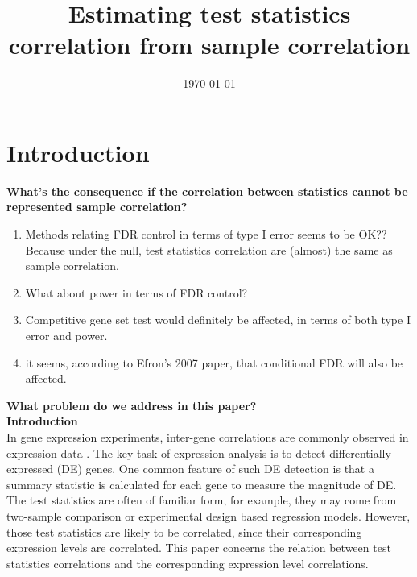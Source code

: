 \documentclass[12pt, a4paper]{article}
\title{Estimating test statistics correlation from sample correlation}
\date{\today} %
\begin{document}
	\maketitle
	\section{Introduction}
	\textbf{What's the consequence if the correlation between statistics cannot be represented sample correlation?}
	\begin{enumerate}
		\item Methods relating FDR control in terms of type I error seems to be OK?? Because under the null, test statistics correlation are (almost) the same as sample correlation.
		\item What about power in terms of FDR control?
		\item Competitive gene set test would definitely be affected, in terms of both type I error and power.  
		\item it seems, according to Efron's 2007 paper, that conditional FDR will also be affected. 
	\end{enumerate}
	
	\textbf{What problem do we address in this paper?}\\

	
	\textbf{Introduction}\\
	In gene expression experiments, inter-gene correlations are commonly observed in expression data \citep{efron2012large, qiu2005effects,barry2008statistical, efron2007correlation,storey2003positive, huang2013gene, wu2012camera, gatti2010heading}.
	 The key task of expression analysis is to detect differentially expressed (DE) genes. One common feature of such DE detection is that a
	  summary statistic is calculated for each gene to measure the magnitude of DE. The test statistics are often of familiar form, for example, 
	  they may come from two-sample comparison or experimental design based regression models. However, those test statistics are likely to be 
	  correlated, since their 
	  corresponding expression levels are correlated. This paper concerns the relation between test statistics correlations and the 
	  corresponding expression level correlations.
	
\end{document}
